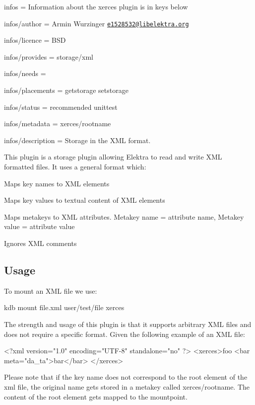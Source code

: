 
\begin{DoxyItemize}
\item infos = Information about the xerces plugin is in keys below
\item infos/author = Armin Wurzinger \href{mailto:e1528532@libelektra.org}{\tt e1528532@libelektra.\+org}
\item infos/licence = B\+SD
\item infos/provides = storage/xml
\item infos/needs =
\item infos/placements = getstorage setstorage
\item infos/status = recommended unittest
\item infos/metadata = xerces/rootname
\item infos/description = Storage in the X\+ML format.
\end{DoxyItemize}

This plugin is a storage plugin allowing Elektra to read and write X\+ML formatted files. It uses a general format which\+:


\begin{DoxyItemize}
\item Maps key names to X\+ML elements
\item Maps key values to textual content of X\+ML elements
\item Maps metakeys to X\+ML attributes. Metakey name = attribute name, Metakey value = attribute value
\item Ignores X\+ML comments
\end{DoxyItemize}

\subsection*{Usage}

To mount an X\+ML file we use\+: \begin{DoxyVerb}    kdb mount file.xml user/test/file xerces
\end{DoxyVerb}


The strength and usage of this plugin is that it supports arbitrary X\+ML files and does not require a specific format. Given the following example of an X\+ML file\+: \begin{DoxyVerb}    <?xml version="1.0" encoding="UTF-8" standalone="no" ?>
    <xerces>foo
      <bar meta="da_ta">bar</bar>
    </xerces>
\end{DoxyVerb}


Please note that if the key name does not correspond to the root element of the xml file, the original name gets stored in a metakey called {\ttfamily xerces/rootname}. The content of the root element gets mapped to the mountpoint.


